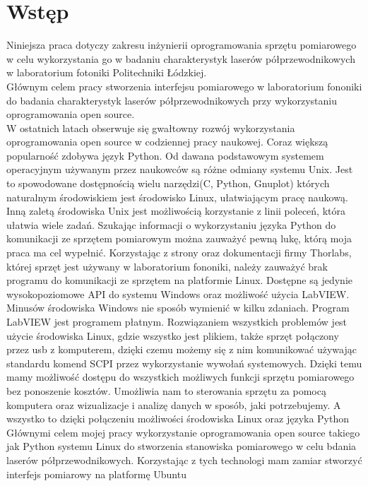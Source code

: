 \chapter{Wstęp} \label{rozdz.wstep}
Niniejsza praca dotyczy zakresu inżynierii oprogramowania sprzętu pomiarowego w celu wykorzystania go w badaniu charakterystyk laserów półprzewodnikowych w laboratorium fotoniki Politechniki Łódzkiej. \\

Głównym celem pracy stworzenia interfejsu
pomiarowego w laboratorium fononiki do badania charakterystyk laserów półprzewodnikowych przy wykorzystaniu oprogramowania
open source. \\
W ostatnich latach obserwuje się gwałtowny rozwój wykorzystania oprogramowania
open source w codziennej pracy naukowej. Coraz większą popularność zdobywa język Python.
Od dawana podstawowym systemem operacyjnym używanym przez naukowców są różne odmiany systemu Unix.
Jest to spowodowane dostępnością wielu narzędzi(C, Python,
Gnuplot) których naturalnym środowiskiem jest środowisko Linux, ułatwiającym pracę naukową. Inną
zaletą środowiska Unix jest możliwością korzystanie z linii poleceń, która ułatwia wiele
zadań. Szukając informacji o wykorzystaniu języka Python do komunikacji ze sprzętem pomiarowym można zauważyć pewną lukę,
którą moja praca ma cel wypełnić. Korzystając
z strony oraz dokumentacji firmy Thorlabs, której sprzęt jest używany w laboratorium
fononiki, należy zauważyć brak programu do komunikacji ze sprzętem na platformie Linux.
Dostępne są jedynie wysokopoziomowe API do systemu Windows oraz możliwość użycia
LabVIEW. Minusów środowiska Windows nie sposób wymienić w kilku zdaniach. Program
LabVIEW jest programem płatnym. Rozwiązaniem wszystkich problemów jest użycie środowiska Linux,
gdzie wszystko jest plikiem, także sprzęt połączony przez usb z komputerem, dzięki czemu możemy się z nim komunikować używając standardu komend SCPI przez
wykorzystanie wywołań systemowych. Dzięki temu mamy możliwość dostępu do wszystkich możliwych funkcji sprzętu
pomiarowego bez ponoszenie kosztów. Umożliwia nam to
sterowania sprzętu za pomocą komputera oraz wizualizacje i analizę danych w sposób, jaki
potrzebujemy. A wszystko to dzięki połączeniu możliwości środowiska Linux oraz języka Python \\
Głównymi celem mojej pracy wykorzystanie oprogramowania
open source takiego jak Python systemu Linux do stworzenia stanowiska pomiarowego w celu bdania laserów półprzewodnikowych.
Korzystając z tych technologi mam zamiar stworzyć interfejs pomiarowy na platformę Ubuntu
